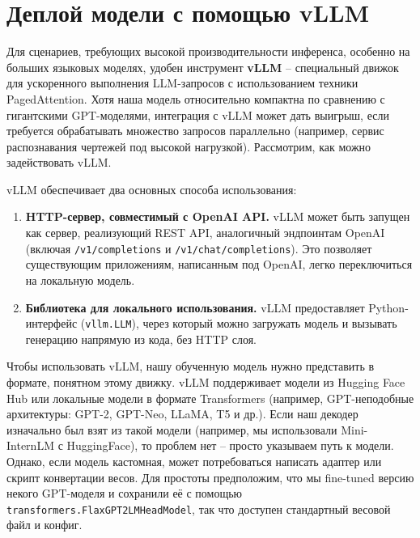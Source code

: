 \documentclass{article}
\begin{document}
\section{Деплой модели с помощью vLLM}

Для сценариев, требующих высокой производительности инференса, особенно на больших языковых моделях, удобен инструмент \textbf{vLLM} – специальный движок для ускоренного выполнения LLM-запросов с использованием техники PagedAttention. Хотя наша модель относительно компактна по сравнению с гигантскими GPT-моделями, интеграция с vLLM может дать выигрыш, если требуется обрабатывать множество запросов параллельно (например, сервис распознавания чертежей под высокой нагрузкой). Рассмотрим, как можно задействовать vLLM.

vLLM обеспечивает два основных способа использования:
\begin{enumerate}
\item \textbf{HTTP-сервер, совместимый с OpenAI API.} vLLM может быть запущен как сервер, реализующий REST API, аналогичный эндпоинтам OpenAI (включая \texttt{/v1/completions} и \texttt{/v1/chat/completions}). Это позволяет существующим приложениям, написанным под OpenAI, легко переключиться на локальную модель.
\item \textbf{Библиотека для локального использования.} vLLM предоставляет Python-интерфейс (\texttt{vllm.LLM}), через который можно загружать модель и вызывать генерацию напрямую из кода, без HTTP слоя.
\end{enumerate}

Чтобы использовать vLLM, нашу обученную модель нужно представить в формате, понятном этому движку. vLLM поддерживает модели из Hugging Face Hub или локальные модели в формате Transformers (например, GPT-неподобные архитектуры: GPT-2, GPT-Neo, LLaMA, T5 и др.). Если наш декодер изначально был взят из такой модели (например, мы использовали Mini-InternLM с HuggingFace), то проблем нет – просто указываем путь к модели. Однако, если модель кастомная, может потребоваться написать адаптер или скрипт конвертации весов. Для простоты предположим, что мы fine-tuned версию некого GPT-моделя и сохранили её с помощью \texttt{transformers.FlaxGPT2LMHeadModel}, так что доступен стандартный весовой файл и конфиг.
\end{document}
